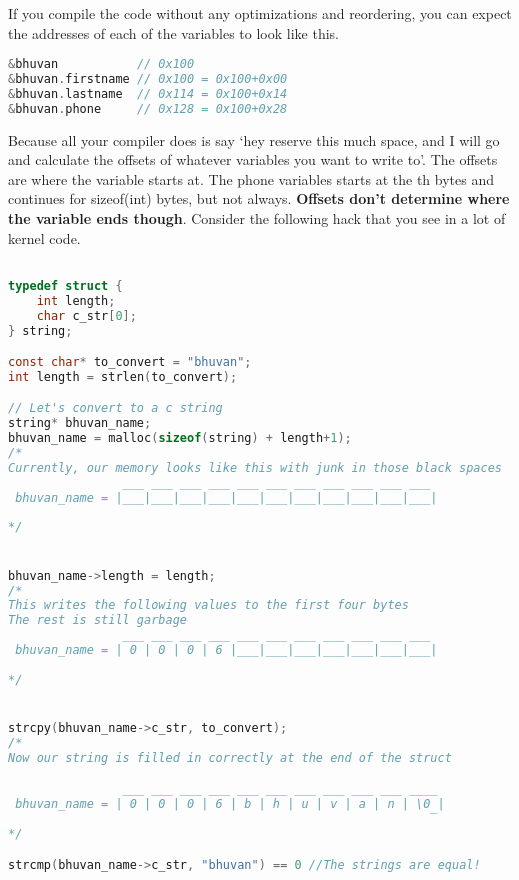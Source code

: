 If you compile the code without any optimizations and reordering, you can expect the addresses of each of the variables to look like this.

\begin{lstlisting}[language=C]
&bhuvan           // 0x100
&bhuvan.firstname // 0x100 = 0x100+0x00
&bhuvan.lastname  // 0x114 = 0x100+0x14
&bhuvan.phone     // 0x128 = 0x100+0x28
\end{lstlisting}

 Because all your compiler does is say `hey reserve this much space, and I will go and calculate the offsets of whatever variables you want to write to'. The offsets are where the variable starts at. The phone variables starts at the th bytes and continues for sizeof(int) bytes, but not always. \textbf{Offsets don't determine where the variable ends though}. Consider the following hack that you see in a lot of kernel code.

\begin{lstlisting}[language=C]

typedef struct {
    int length;
    char c_str[0];
} string;

const char* to_convert = "bhuvan";
int length = strlen(to_convert);

// Let's convert to a c string
string* bhuvan_name;
bhuvan_name = malloc(sizeof(string) + length+1);
/*
Currently, our memory looks like this with junk in those black spaces
                ___ ___ ___ ___ ___ ___ ___ ___ ___ ___ ___
 bhuvan_name = |___|___|___|___|___|___|___|___|___|___|___|
                                                           
*/


bhuvan_name->length = length;
/*
This writes the following values to the first four bytes
The rest is still garbage
                ___ ___ ___ ___ ___ ___ ___ ___ ___ ___ ___
 bhuvan_name = | 0 | 0 | 0 | 6 |___|___|___|___|___|___|___|
                                                           
*/


strcpy(bhuvan_name->c_str, to_convert);
/*
Now our string is filled in correctly at the end of the struct

                ___ ___ ___ ___ ___ ___ ___ ___ ___ ___ ____
 bhuvan_name = | 0 | 0 | 0 | 6 | b | h | u | v | a | n | \0 |
                                                           ‾
*/

strcmp(bhuvan_name->c_str, "bhuvan") == 0 //The strings are equal!
\end{lstlisting}

